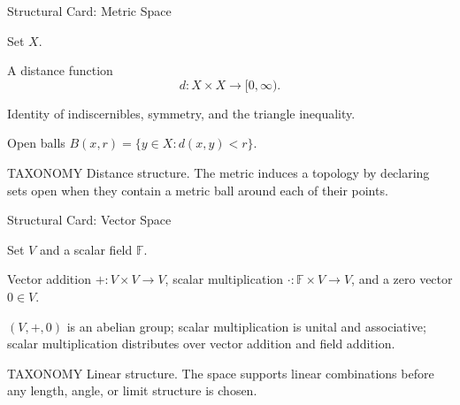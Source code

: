 \begin{remark*}
\begin{structureblueprint}{Structural Card: Metric Space}
\begin{structureinherits}
Set \(X\).
\end{structureinherits}
\begin{structurenew}
A distance function
\[
  d:X\times X\to[0,\infty).
\]
\end{structurenew}
\begin{structuretheory}
Identity of indiscernibles, symmetry, and the triangle inequality.
\end{structuretheory}
\begin{structureusesa}
Open balls \(B(x,r)=\{y\in X:d(x,y)<r\}\).
\end{structureusesa}
\begin{structuresection}{TAXONOMY}
Distance structure.  The metric induces a topology by declaring sets open
when they contain a metric ball around each of their points.
\end{structuresection}
\end{structureblueprint}

\begin{structureblueprint}{Structural Card: Vector Space}
\begin{structureinherits}
Set \(V\) and a scalar field \(\mathbb F\).
\end{structureinherits}
\begin{structurenew}
Vector addition \(+:V\times V\to V\), scalar multiplication
\(\cdot:\mathbb F\times V\to V\), and a zero vector \(0\in V\).
\end{structurenew}
\begin{structuretheory}
\((V,+,0)\) is an abelian group; scalar multiplication is unital and
associative; scalar multiplication distributes over vector addition and field
addition.
\end{structuretheory}
\begin{structuresection}{TAXONOMY}
Linear structure.  The space supports linear combinations before any length,
angle, or limit structure is chosen.
\end{structuresection}
\end{structureblueprint}


\end{remark*}
